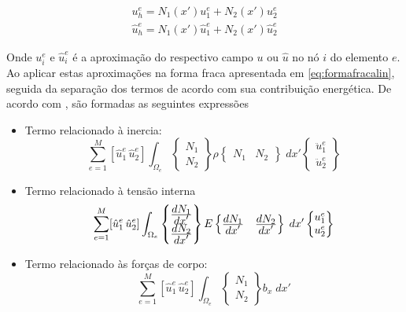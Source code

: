 \begin{align}
    u_h^e = N_1(x')u_1^e + N_2(x')u_2^e \\
    \hat{u}_h^e = N_1(x')\hat{u}_1^e + N_2(x')\hat{u}_2^e
\end{align}

Onde $ u^e_i $ e $ \hat{u}^e_i $ é a aproximação do respectivo campo $ u $ ou $ \hat{u} $ no nó $ i $ do elemento $ e $. Ao aplicar estas aproximações na forma fraca apresentada em \ref{eq:formafracalin}, seguida da separação dos termos de acordo com sua contribuição energética. De acordo com \cite{zienkiewicz2013}, são formadas as seguintes expressões

\begin{itemize}
    \item Termo relacionado à inercia: \begin{equation}
        \sum_{e=1}^M [\hat{u}^e_1 \, \hat{u}^e_2 ] \int_{\Omega_e} \begin{Bmatrix} N_1 \\ N_2 \end{Bmatrix} \rho \begin{Bmatrix} N_1 & N_2 \end{Bmatrix} \; dx' \begin{Bmatrix} \ddot{u}^e_1 \\ \ddot{u}^e_2 \end{Bmatrix}
    \end{equation}
    
    \item Termo relacionado à tensão interna \begin{equation}
        \sum_{e=1}^M [\hat{u}^e_1 \, \hat{u}^e_2 ] \int_{\Omega_e} \begin{Bmatrix} \frac{\displaystyle dN_1}{\displaystyle dx'} \\ \frac{\displaystyle dN_2}{\displaystyle dx'}  \end{Bmatrix} E \begin{Bmatrix} \frac{\displaystyle dN_1}{\displaystyle dx'}  & \frac{\displaystyle dN_2}{\displaystyle dx'}  \end{Bmatrix} \; dx' \begin{Bmatrix} u^e_1 \\ u^e_2 \end{Bmatrix}
    \end{equation}
    
    \item Termo relacionado às forças de corpo: 
    \begin{equation}
        \sum_{e=1}^M [\hat{u}^e_1 \, \hat{u}^e_2 ] \int_{\Omega_e} \begin{Bmatrix} N_1 \\ N_2  \end{Bmatrix} b_x \; dx'
    \end{equation}
\end{itemize}

